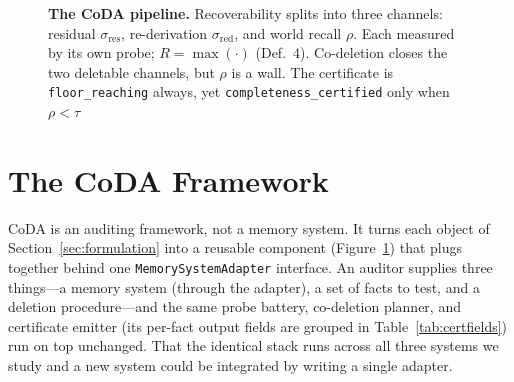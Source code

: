\documentclass[letterpaper]{article}
\begin{document}
\begin{figure}[t]
{%
}
\caption{\textbf{The CoDA pipeline.} Recoverability splits into three channels: residual
$\sigma_{\mathrm{res}}$, re-derivation $\sigma_{\mathrm{red}}$, and world recall
$\rho$. Each measured by its own probe; $R{=}\max(\cdot)$ (Def.~4). Co-deletion closes the two
deletable channels, but $\rho$ is a wall. The certificate is \texttt{floor\_reaching} always, yet
\texttt{completeness\_certified} only when $\rho<\tau$}
\label{fig:pipeline}
\end{figure}

\section{The CoDA Framework}\label{sec:method}

CoDA is an auditing framework, not a memory system. It turns each object of
Section~\ref{sec:formulation} into a reusable component (Figure~\ref{fig:pipeline}) that
plugs together behind one \texttt{MemorySystemAdapter} interface. An auditor supplies
three things---a memory system (through the adapter), a set of facts to test, and a
deletion procedure---and the same probe battery, co-deletion planner, and certificate
emitter (its per-fact output fields are grouped in Table~\ref{tab:certfields}) run on top unchanged. That the identical stack runs across all three systems we
study and a new system could be integrated by writing a single adapter.
\end{document}
